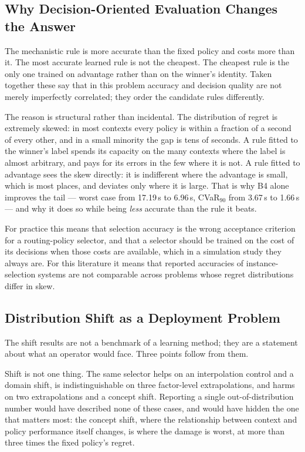 \documentclass[preprint,12pt]{elsarticle}
\begin{document}
\subsection{Why Decision-Oriented Evaluation Changes the Answer}
\label{sec:disc:decision}

The mechanistic rule is more accurate than the fixed policy and costs more than
it. The most accurate learned rule is not the cheapest. The cheapest rule is the
only one trained on advantage rather than on the winner's identity. Taken
together these say that in this problem accuracy and decision quality are not
merely imperfectly correlated; they order the candidate rules differently.

The reason is structural rather than incidental. The distribution of regret is
extremely skewed: in most contexts every policy is within a fraction of a second
of every other, and in a small minority the gap is tens of seconds. A rule fitted
to the winner's label spends its capacity on the many contexts where the label is
almost arbitrary, and pays for its errors in the few where it is not. A rule fitted
to advantage sees the skew directly: it is indifferent where the advantage is
small, which is most places, and deviates only where it is large. That is why B4
alone improves the tail --- worst case from 17.19\,s to 6.96\,s, CVaR$_{90}$ from
3.67\,s to 1.66\,s --- and why it does so while being \emph{less} accurate than the
rule it beats.

For practice this means that selection accuracy is the wrong acceptance criterion
for a routing-policy selector, and that a selector should be trained on the cost
of its decisions when those costs are available, which in a simulation study they
always are. For this literature it means that reported accuracies of
instance-selection systems are not comparable across problems whose regret
distributions differ in skew.

\subsection{Distribution Shift as a Deployment Problem}
\label{sec:disc:shift}

The shift results are not a benchmark of a learning method; they are a statement
about what an operator would face. Three points follow from them.

Shift is not one thing. The same selector helps on an interpolation control and a
domain shift, is indistinguishable on three factor-level extrapolations, and
harms on two extrapolations and a concept shift. Reporting a single
out-of-distribution number would have described none of these cases, and would
have hidden the one that matters most: the concept shift, where the relationship
between context and policy performance itself changes, is where the damage is
worst, at more than three times the fixed policy's regret.
\end{document}
